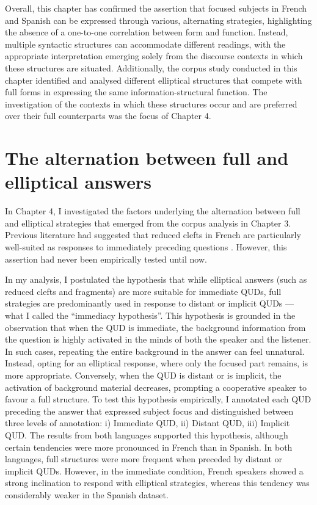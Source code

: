 Overall, this chapter has confirmed the assertion that focused subjects in French and Spanish can be expressed through various, alternating strategies, highlighting the absence of a one-to-one correlation between form and function. Instead, multiple syntactic structures can accommodate different readings, with the appropriate interpretation emerging solely from the discourse contexts in which these structures are situated. Additionally, the corpus study conducted in this chapter identified and analysed different elliptical structures that compete with full forms in expressing the same information-structural function. The investigation of the contexts in which these structures occur and are preferred over their full counterparts was the focus of Chapter 4.




\section{The alternation between full and elliptical answers} %


In Chapter 4, I investigated the factors underlying the alternation between full and elliptical strategies that emerged from the corpus analysis in Chapter 3. Previous literature had suggested that reduced clefts in French are particularly well-suited as responses to immediately preceding questions \parencite{belletti2008answering, katz2000categories}. However, this assertion had never been empirically tested until now.

In my analysis, I postulated the hypothesis that while elliptical answers (such as reduced clefts and fragments) are more suitable for immediate QUDs, full strategies are predominantly used in response to distant or implicit QUDs — what I called the ``immediacy hypothesis”. This hypothesis is grounded in the observation that when the QUD is immediate, the background information from the question is highly activated in the minds of both the speaker and the listener. In such cases, repeating the entire background in the answer can feel unnatural. Instead, opting for an elliptical response, where only the focused part remains, is more appropriate. Conversely, when the QUD is distant or is implicit, the activation of background material decreases, prompting a cooperative speaker to favour a full structure.
To test this hypothesis empirically, I annotated each QUD preceding the answer that expressed subject focus and distinguished between three levels of annotation: i) Immediate QUD, ii) Distant QUD, iii) Implicit QUD. The results from both languages supported this hypothesis, although certain tendencies were more pronounced in French than in Spanish. In both languages, full structures were more frequent when preceded by distant or implicit QUDs. However, in the immediate condition, French speakers showed a strong inclination to respond with elliptical strategies, whereas this tendency was considerably weaker in the Spanish dataset.

